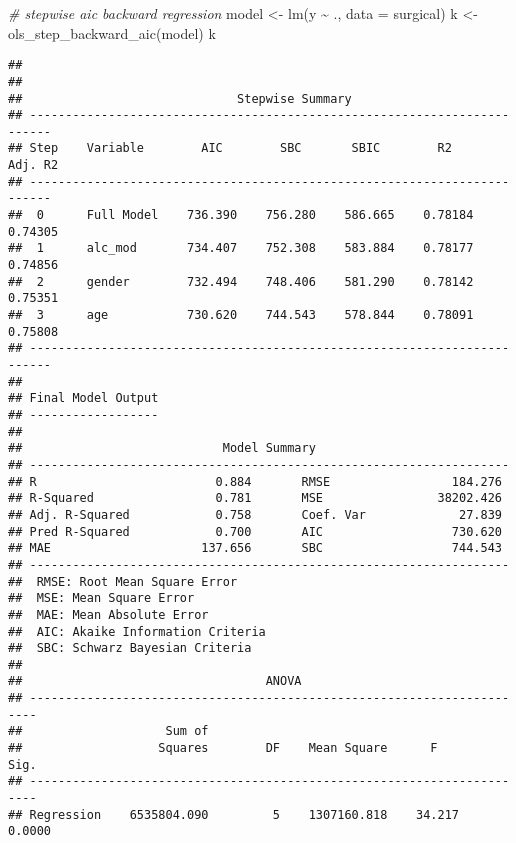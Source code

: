 \documentclass[
]{article}
\newenvironment{Shaded}{\begin{snugshade}}{\end{snugshade}}
\newcommand{\AttributeTok}[1]{\textcolor[rgb]{0.77,0.63,0.00}{#1}}
\newcommand{\CommentTok}[1]{\textcolor[rgb]{0.56,0.35,0.01}{\textit{#1}}}
\newcommand{\FunctionTok}[1]{\textcolor[rgb]{0.00,0.00,0.00}{#1}}
\newcommand{\NormalTok}[1]{#1}
\newcommand{\OtherTok}[1]{\textcolor[rgb]{0.56,0.35,0.01}{#1}}
\newcommand{\SpecialCharTok}[1]{\textcolor[rgb]{0.00,0.00,0.00}{#1}}
\begin{document}
\begin{Shaded}
\begin{Highlighting}[]
\CommentTok{\# stepwise aic backward regression}
\NormalTok{model }\OtherTok{\textless{}{-}} \FunctionTok{lm}\NormalTok{(y }\SpecialCharTok{\textasciitilde{}}\NormalTok{ ., }\AttributeTok{data =}\NormalTok{ surgical)}
\NormalTok{k }\OtherTok{\textless{}{-}} \FunctionTok{ols\_step\_backward\_aic}\NormalTok{(model)}
\NormalTok{k}
\end{Highlighting}
\end{Shaded}

\begin{verbatim}
## 
## 
##                              Stepwise Summary                              
## -------------------------------------------------------------------------
## Step    Variable        AIC        SBC       SBIC        R2       Adj. R2 
## -------------------------------------------------------------------------
##  0      Full Model    736.390    756.280    586.665    0.78184    0.74305 
##  1      alc_mod       734.407    752.308    583.884    0.78177    0.74856 
##  2      gender        732.494    748.406    581.290    0.78142    0.75351 
##  3      age           730.620    744.543    578.844    0.78091    0.75808 
## -------------------------------------------------------------------------
## 
## Final Model Output 
## ------------------
## 
##                            Model Summary                            
## -------------------------------------------------------------------
## R                         0.884       RMSE                 184.276 
## R-Squared                 0.781       MSE                38202.426 
## Adj. R-Squared            0.758       Coef. Var             27.839 
## Pred R-Squared            0.700       AIC                  730.620 
## MAE                     137.656       SBC                  744.543 
## -------------------------------------------------------------------
##  RMSE: Root Mean Square Error 
##  MSE: Mean Square Error 
##  MAE: Mean Absolute Error 
##  AIC: Akaike Information Criteria 
##  SBC: Schwarz Bayesian Criteria 
## 
##                                  ANOVA                                  
## -----------------------------------------------------------------------
##                    Sum of                                              
##                   Squares        DF    Mean Square      F         Sig. 
## -----------------------------------------------------------------------
## Regression    6535804.090         5    1307160.818    34.217    0.0000 

\end{verbatim}
\end{document}
